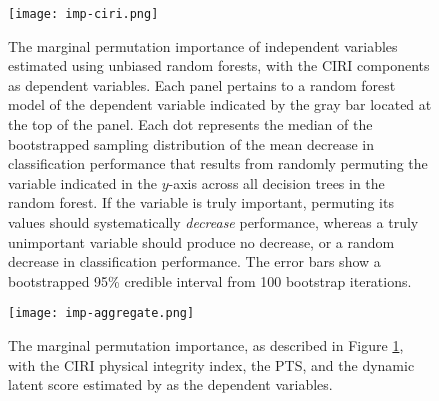 \documentclass[11pt]{article}
\begin{document}
\begin{figure}[!htpb]
\centering
\texttt{[image: imp-ciri.png]}
\caption{The marginal permutation importance of independent variables estimated using unbiased random forests, with the CIRI components as dependent variables. Each panel pertains to a random forest model of the dependent variable indicated by the gray bar located at the top of the panel. Each dot represents the median of the bootstrapped sampling distribution of the mean decrease in classification performance that results from randomly permuting the variable indicated in the $y$-axis across all decision trees in the random forest. If the variable is truly important, permuting its values should systematically \textit{decrease} performance, whereas a truly unimportant variable should produce no decrease, or a random decrease in classification performance. The error bars show a bootstrapped 95\% credible interval from 100 bootstrap iterations.}
\label{fig:imp-ciri}
\end{figure}

\begin{figure}[!htpb]
\centering
\texttt{[image: imp-aggregate.png]}
\caption{The marginal permutation importance, as described in Figure \ref{fig:imp-ciri}, with the CIRI physical integrity index, the PTS, and the dynamic latent score estimated by \citet{Fariss2013} as the dependent variables.}
\label{fig:imp-aggregate}
\end{figure}
\end{document}
